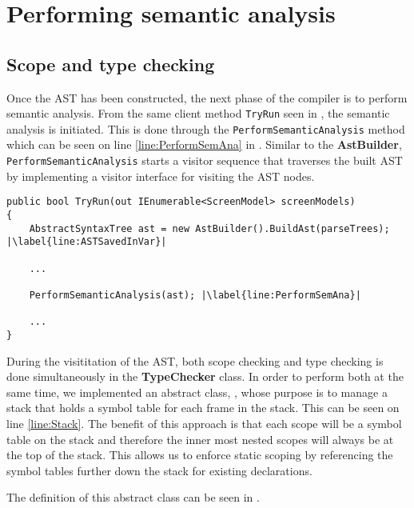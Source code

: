 \section{Performing semantic analysis}

\subsection*{Scope and type checking} \label{sec:TypeChecker}
Once the AST has been constructed, the next phase of the compiler is to perform semantic analysis. From the same client method \texttt{TryRun} seen in , the semantic analysis is initiated. This is done through the \texttt{PerformSemanticAnalysis} method which can be seen on line \ref{line:PerformSemAna} in .
Similar to the \textbf{AstBuilder}, \texttt{PerformSemanticAnalysis} starts a visitor sequence that traverses the built AST by implementing a visitor interface for visiting the AST nodes.

\begin{lstlisting}[language=CSharp, caption={The Run method that serves as a client inside the DazelCompiler class}, label={lst:RunMethodSecond},escapechar=|]
public bool TryRun(out IEnumerable<ScreenModel> screenModels)
{
    AbstractSyntaxTree ast = new AstBuilder().BuildAst(parseTrees); |\label{line:ASTSavedInVar}|

    ...
    
    PerformSemanticAnalysis(ast); |\label{line:PerformSemAna}|

    ...
}
\end{lstlisting}

During the visititation of the AST, both scope checking and type checking is done simultaneously in the \textbf{TypeChecker} class. 
In order to perform both at the same time, we implemented an abstract class, \abstractsemanticclass{}, whose purpose is to manage a stack that holds a symbol table for each frame in the stack. This can be seen on line \ref{line:Stack}. The benefit of this approach is that each scope will be a symbol table on the stack and therefore the inner most nested scopes will always be at the top of the stack. This allows us to enforce static scoping by referencing the symbol tables further down the stack for existing declarations.

The definition of this abstract class can be seen in .


